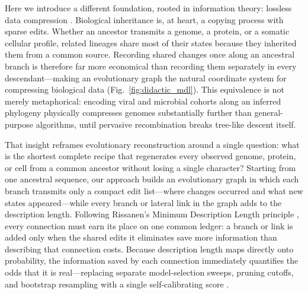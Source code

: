 \documentclass[12pt]{article}
\begin{document}
Here we introduce a different foundation, rooted in information theory: lossless data compression \cite{rissanen1978modeling,rissanen1983universal}. Biological inheritance is, at heart, a copying process with sparse edits. Whether an ancestor transmits a genome, a protein, or a somatic cellular profile, related lineages share most of their states because they inherited them from a common source. Recording shared changes once along an ancestral branch is therefore far more economical than recording them separately in every descendant---making an evolutionary graph the natural coordinate system for compressing biological data (Fig.~\ref{fig:didactic_mdl}). This equivalence is not merely metaphorical: encoding viral and microbial cohorts along an inferred phylogeny physically compresses genomes substantially further than general-purpose algorithms, until pervasive recombination breaks tree-like descent itself.

That insight reframes evolutionary reconstruction around a single question: what is the shortest complete recipe that regenerates every observed genome, protein, or cell from a common ancestor without losing a single character? Starting from one ancestral sequence, our approach builds an evolutionary graph in which each branch transmits only a compact edit list---where changes occurred and what new states appeared---while every branch or lateral link in the graph adds to the description length. Following Rissanen's Minimum Description Length principle \cite{rissanen1978modeling,rissanen1983universal}, every connection must earn its place on one common ledger: a branch or link is added only when the shared edits it eliminates save more information than describing that connection costs. Because description length maps directly onto probability, the information saved by each connection immediately quantifies the odds that it is real---replacing separate model-selection sweeps, pruning cutoffs, and bootstrap resampling with a single self-calibrating score \cite{felsenstein1985confidence,kosakovskypond2006gard}.
\end{document}
